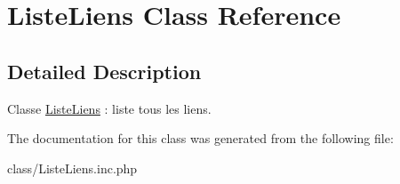 \hypertarget{class_liste_liens}{
\section{ListeLiens Class Reference}
\label{class_liste_liens}
}


\subsection{Detailed Description}
Classe \hyperlink{class_liste_liens}{ListeLiens} : liste tous les liens. 

The documentation for this class was generated from the following file:\begin{DoxyCompactItemize}
\item 
class/ListeLiens.inc.php\end{DoxyCompactItemize}
